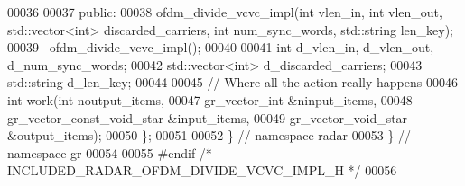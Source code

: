 \begin{DoxyCode}
00036 
00037      \textcolor{keyword}{public}:
00038       ofdm_divide_vcvc_impl(\textcolor{keywordtype}{int} vlen\_in, \textcolor{keywordtype}{int} vlen\_out, std::vector<int> discarded\_carriers, \textcolor{keywordtype}{int} 
      num\_sync\_words, std::string len\_key);
00039       ~ofdm_divide_vcvc_impl();
00040       
00041       \textcolor{keywordtype}{int} d_vlen_in, d_vlen_out, d_num_sync_words;
00042       std::vector<int> d_discarded_carriers;
00043       std::string d_len_key;
00044 
00045       \textcolor{comment}{// Where all the action really happens}
00046       \textcolor{keywordtype}{int} work(\textcolor{keywordtype}{int} noutput\_items,
00047                gr\_vector\_int &ninput\_items,
00048                gr\_vector\_const\_void\_star &input\_items,
00049                gr\_vector\_void\_star &output\_items);
00050     \};
00051 
00052   \} \textcolor{comment}{// namespace radar}
00053 \} \textcolor{comment}{// namespace gr}
00054 
00055 \textcolor{preprocessor}{#endif }\textcolor{comment}{/* INCLUDED\_RADAR\_OFDM\_DIVIDE\_VCVC\_IMPL\_H */}\textcolor{preprocessor}{}
00056 
\end{DoxyCode}
